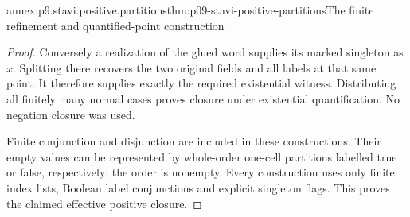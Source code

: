 \begin{annexitem}{annex:p9.stavi.positive.partitions}{thm:p09-stavi-positive-partitions}{The finite refinement and quantified-point construction}
\begin{proof}
Conversely a realization
of the glued word
supplies its marked
singleton as \(x\).
Splitting there
recovers the two
original fields
and all labels
at that same
point. It
therefore supplies
exactly the
required existential
witness. Distributing
all finitely many
normal cases proves
closure under
existential quantification.
No negation closure
was used.

Finite conjunction
and disjunction
are included in
these constructions.
Their empty values
can be represented
by whole-order
one-cell partitions
labelled true or
false, respectively;
the order is
nonempty. Every
construction uses
only finite index
lists, Boolean
label conjunctions
and explicit
singleton flags.
This proves
the claimed
effective positive
closure.
\end{proof}
\end{annexitem}

